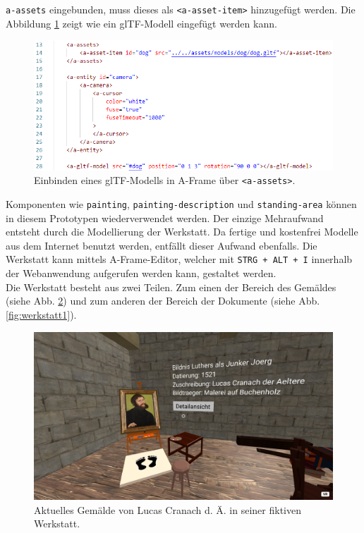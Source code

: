 \documentclass[a4paper,12pt,oneside]{article}
\begin{document}
        \texttt{a-assets} eingebunden, muss dieses als \texttt{<a-asset-item>}
        hinzugefügt werden. Die Abbildung \ref{fig:gltf1} zeigt wie ein glTF-Modell 
        eingefügt werden kann.
        \begin{figure}
          \centering
          \includegraphics{img/coding/gltf1.png}
          \caption{Einbinden eines glTF-Modells in A-Frame über \texttt{<a-assets>}.}
          \label{fig:gltf1}
        \end{figure}
        Komponenten wie \texttt{painting}, \texttt{painting-description} und 
        \texttt{standing-area} können in diesem Prototypen wiederverwendet
        werden. Der einzige Mehraufwand entsteht durch die Modellierung
        der Werkstatt. Da fertige und kostenfrei Modelle aus dem Internet
        benutzt werden, entfällt dieser Aufwand ebenfalls. Die Werkstatt
        kann mittels A-Frame-Editor, welcher mit \texttt{STRG + ALT + I}
        innerhalb der Webanwendung aufgerufen werden kann, gestaltet werden. \\
        Die Werkstatt besteht aus zwei Teilen. Zum einen der Bereich des
        Gemäldes 
        (siehe Abb. \ref{fig:werkstatt2})
        und zum anderen der Bereich der Dokumente
        (siehe Abb. \ref{fig:werkstatt1}). \\
        \begin{figure}
          \centering
          \includegraphics[scale=0.3]{img/coding/werkstatt2.png}
          \caption{Aktuelles Gemälde von Lucas Cranach d. Ä. in seiner fiktiven Werkstatt.}
          \label{fig:werkstatt2}
        \end{figure}
\end{document}
